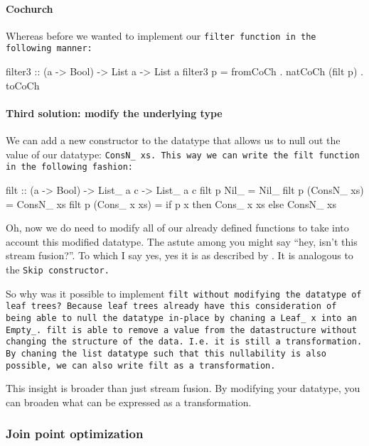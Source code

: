 \paragraph{Cochurch}
Whereas before we wanted to implement our \tt{filter} function in the following manner:
\begin{code}
filter3 :: (a -> Bool) -> List a -> List a
filter3 p = fromCoCh . natCoCh (filt p) . toCoCh
\end{code}


\paragraph{Third solution: modify the underlying type}
We can add a new constructor to the datatype that allows us to null out the value of our datatype: \tt{ConsN\_ xs}.
This way we can write the \tt{filt} function in the following fashion:
\begin{code}
filt :: (a -> Bool) -> List_ a c -> List_ a c
filt p Nil_ = Nil_
filt p (ConsN_ xs) = ConsN_ xs
filt p (Cons_ x xs) = if p x then Cons_ x xs else ConsN_ xs
\end{code}
Oh, now we do need to modify all of our already defined functions to take into account this modified datatype.
The astute among you might say ``hey, isn't this stream fusion?''.
To which I say yes, yes it is as described by \cite{Coutts2007}.
It is analogous to the \tt{Skip} constructor.

So why was it possible to implement \tt{filt} without modifying the datatype of leaf trees?
Because leaf trees already have this consideration of being able to null the datatype in-place by chaning a \tt{Leaf\_ x} into an \tt{Empty\_}.
\tt{filt} is able to remove a value from the datastructure without changing the structure of the data. I.e. it is still a transformation.
By chaning the list datatype such that this nullability is also possible, we can also write \tt{filt} as a transformation.

This insight is broader than just stream fusion.
By modifying your datatype, you can broaden what can be expressed as a transformation.


\subsubsection{Join point optimization}\label{sec:join}
